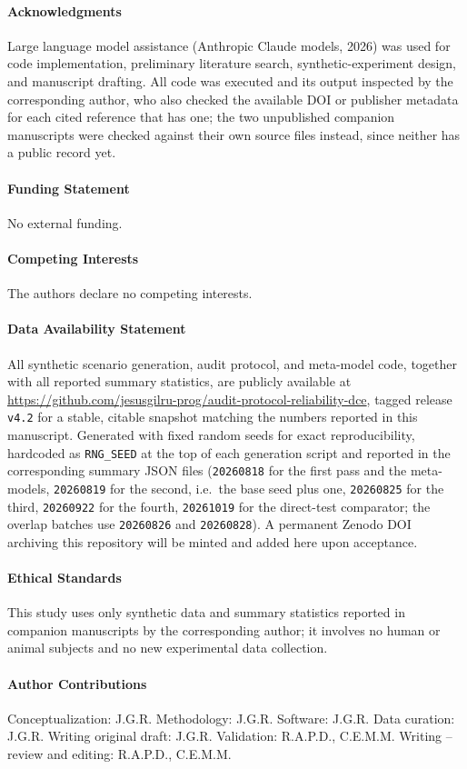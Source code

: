\documentclass[journal=dce]{CUP-JNL-DTM}%
\begin{document}
\begin{Backmatter}

\paragraph{Acknowledgments}
Large language model assistance (Anthropic Claude models, 2026) was used for code implementation, preliminary literature search, synthetic-experiment design, and manuscript drafting. All code was executed and its output inspected by the corresponding author, who also checked the available DOI or publisher metadata for each cited reference that has one; the two unpublished companion manuscripts were checked against their own source files instead, since neither has a public record yet.

\paragraph{Funding Statement}
No external funding.

\paragraph{Competing Interests}
The authors declare no competing interests.

\paragraph{Data Availability Statement}
All synthetic scenario generation, audit protocol, and meta-model code, together with all reported summary statistics, are publicly available at \url{https://github.com/jesusgilru-prog/audit-protocol-reliability-dce}, tagged release \texttt{v4.2} for a stable, citable snapshot matching the numbers reported in this manuscript. Generated with fixed random seeds for exact reproducibility, hardcoded as \texttt{RNG\_SEED} at the top of each generation script and reported in the corresponding summary JSON files (\texttt{20260818} for the first pass and the meta-models, \texttt{20260819} for the second, i.e.\ the base seed plus one, \texttt{20260825} for the third, \texttt{20260922} for the fourth, \texttt{20261019} for the direct-test comparator; the overlap batches use \texttt{20260826} and \texttt{20260828}). A permanent Zenodo DOI archiving this repository will be minted and added here upon acceptance.

\paragraph{Ethical Standards}
This study uses only synthetic data and summary statistics reported in companion manuscripts by the corresponding author; it involves no human or animal subjects and no new experimental data collection.

\paragraph{Author Contributions}
Conceptualization: J.G.R. Methodology: J.G.R. Software: J.G.R. Data curation: J.G.R. Writing original draft: J.G.R. Validation: R.A.P.D., C.E.M.M. Writing -- review and editing: R.A.P.D., C.E.M.M.




\end{Backmatter}
\end{document}
